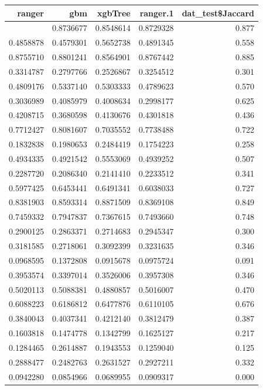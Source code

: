 \documentclass[
  letterpaper,
  DIV=11,
  numbers=noendperiod]{scrartcl}
\begin{document}
\begin{longtable}[]{@{}rrrrr@{}}
\toprule\noalign{}
ranger & gbm & xgbTree & ranger.1 & dat\_test\$Jaccard \\
\midrule\noalign{}
\endhead
\bottomrule\noalign{}
\endlastfoot
0.8719856 & 0.8736677 & 0.8548614 & 0.8729328 & 0.877 \\
0.4858878 & 0.4579301 & 0.5652738 & 0.4891345 & 0.558 \\
0.8755710 & 0.8801241 & 0.8564901 & 0.8767442 & 0.885 \\
0.3314787 & 0.2797766 & 0.2526867 & 0.3254512 & 0.301 \\
0.4809176 & 0.5337140 & 0.5303333 & 0.4789623 & 0.570 \\
0.3036989 & 0.4085979 & 0.4008634 & 0.2998177 & 0.625 \\
0.4208715 & 0.3680598 & 0.4130676 & 0.4301818 & 0.436 \\
0.7712427 & 0.8081607 & 0.7035552 & 0.7738488 & 0.722 \\
0.1832838 & 0.1980653 & 0.2484419 & 0.1754223 & 0.258 \\
0.4934335 & 0.4921542 & 0.5553069 & 0.4939252 & 0.507 \\
0.2287720 & 0.2086340 & 0.2141410 & 0.2233512 & 0.341 \\
0.5977425 & 0.6453441 & 0.6491341 & 0.6038033 & 0.727 \\
0.8381903 & 0.8593314 & 0.8871509 & 0.8369108 & 0.849 \\
0.7459332 & 0.7947837 & 0.7367615 & 0.7493660 & 0.748 \\
0.2900125 & 0.2863371 & 0.2714683 & 0.2945347 & 0.300 \\
0.3181585 & 0.2718061 & 0.3092399 & 0.3231635 & 0.346 \\
0.0968595 & 0.1372808 & 0.0915678 & 0.0975724 & 0.091 \\
0.3953574 & 0.3397014 & 0.3526006 & 0.3957308 & 0.346 \\
0.5020113 & 0.5088381 & 0.4880857 & 0.5016007 & 0.470 \\
0.6088223 & 0.6186812 & 0.6477876 & 0.6110105 & 0.676 \\
0.3840043 & 0.4037341 & 0.4212140 & 0.3812479 & 0.387 \\
0.1603818 & 0.1474778 & 0.1342799 & 0.1625127 & 0.217 \\
0.1284465 & 0.2614887 & 0.1943553 & 0.1259040 & 0.125 \\
0.2888477 & 0.2482763 & 0.2631527 & 0.2927211 & 0.332 \\
0.0942280 & 0.0854966 & 0.0689955 & 0.0909317 & 0.000 \\

\end{longtable}
\end{document}
